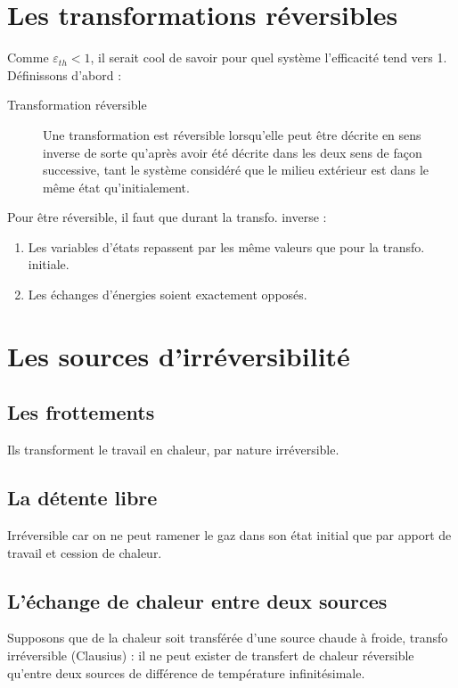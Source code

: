 	\section{Les transformations réversibles}
	Comme $\varepsilon_{th} < 1$, il serait cool de savoir pour quel système
	l'efficacité tend vers 1. Définissons d'abord :
	\begin{description}
	\item[Transformation réversible] Une transformation est 
	réversible lorsqu'elle peut être décrite en sens inverse de 
	sorte qu'après avoir été décrite dans les deux sens de façon 
	successive, tant le système considéré que le milieu extérieur 
	est dans le même état qu'initialement.
	\end{description}
	Pour être réversible, il faut que durant la transfo. inverse :
	\begin{enumerate}
	\item Les variables d'états repassent par les même valeurs que 
	pour la transfo. initiale.
	\item Les échanges d'énergies soient exactement opposés.
	\end{enumerate}
	
	
	\section{Les sources d'irréversibilité}
		\subsection{Les frottements}
		Ils transforment le travail en chaleur, par nature 
		irréversible.
		
		\subsection{La détente libre}
		Irréversible car on ne peut ramener le gaz dans son 
		état initial que par apport de travail et cession de 
		chaleur.
		
		\subsection{L'échange de chaleur entre deux sources}
		Supposons que de la chaleur soit transférée d'une source 
		chaude à froide, transfo irréversible (Clausius) : il 
		ne peut exister de transfert de chaleur réversible qu'entre 
		deux sources de différence de température infinitésimale.
	
	
